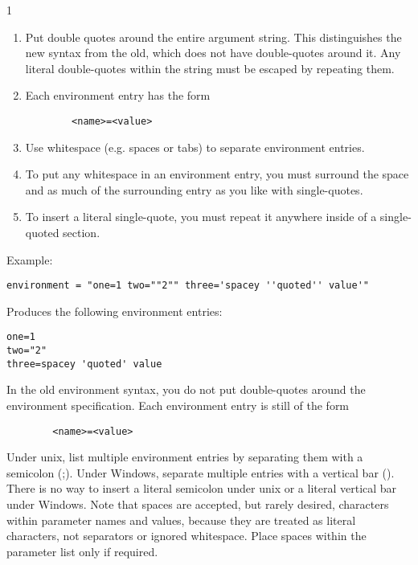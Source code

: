 \begin{ManPage}{\label{man-condor-submit}}{1}
\begin{description}
\begin{enumerate}

\item Put double quotes around the entire argument string.  This
distinguishes the new syntax from the old, which does not have
double-quotes around it.  Any literal double-quotes within the string
must be escaped by repeating them.

\item Each environment entry has the form

\begin{verbatim}
        <name>=<value>
\end{verbatim}

\item Use whitespace (e.g. spaces or tabs) to separate environment entries.

\item To put any whitespace in an environment entry, you must surround
the space and as much of the surrounding entry as you like with
single-quotes.

\item To insert a literal single-quote, you must repeat it anywhere
inside of a single-quoted section.

\end{enumerate}

Example:

\begin{verbatim}
environment = "one=1 two=""2"" three='spacey ''quoted'' value'"
\end{verbatim}

Produces the following environment entries:

\begin{verbatim}
one=1
two="2"
three=spacey 'quoted' value
\end{verbatim}

In the old environment syntax, you do not put double-quotes around the
environment specification.  Each environment entry is still of the form
\begin{verbatim}
        <name>=<value>
\end{verbatim}
Under unix, list multiple environment entries by separating them with
a semicolon (;).  Under Windows, separate multiple entries with a
vertical bar (\Bar).  There is no way to insert a literal semicolon
under unix or a literal vertical bar under Windows.  Note that spaces
are accepted, but rarely desired, characters within parameter names
and values, because they are treated as literal characters, not
separators or ignored whitespace.  Place spaces within the parameter
list only if required.


\end{description}
\end{ManPage}
